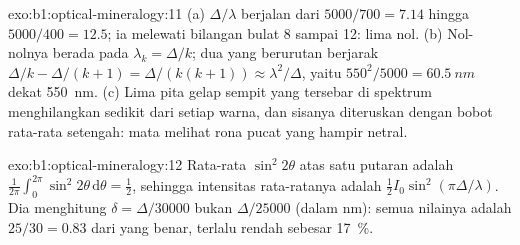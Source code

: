 \begin{solution}{exo:b1:optical-mineralogy:11}
(a) $\Delta/\lambda$ berjalan dari $5000/700 = 7.14$ hingga $5000/400 = 12.5$; ia melewati bilangan bulat 8 sampai 12: lima nol. (b) Nol-nolnya berada pada $\lambda_k = \Delta/k$; dua yang berurutan berjarak $\Delta/k - \Delta/(k + 1) =
\Delta/(k(k + 1)) \approx \lambda^2/\Delta$, yaitu $550^2/5000 =
\qty{60.5}{nm}$ dekat \qty{550}{nm}. (c) Lima pita gelap sempit yang tersebar di spektrum menghilangkan sedikit dari setiap warna, dan sisanya diteruskan dengan bobot rata-rata setengah: mata melihat rona pucat yang hampir netral.
\end{solution}

\begin{solution}{exo:b1:optical-mineralogy:12}
Rata-rata $\sin^2 2\theta$ atas satu putaran adalah $\frac1{2\pi}\int_0^{2\pi}\sin^2 2\theta\,
\mathrm d\theta = \frac12$, sehingga intensitas rata-ratanya adalah
$\frac12 I_0\sin^2(\pi\Delta/\lambda)$. Dia menghitung $\delta = \Delta/30000$
bukan $\Delta/25000$ (dalam nm): semua nilainya adalah $25/30 = 0.83$ dari yang benar, terlalu rendah sebesar \qty{17}{\percent}.
\end{solution}


